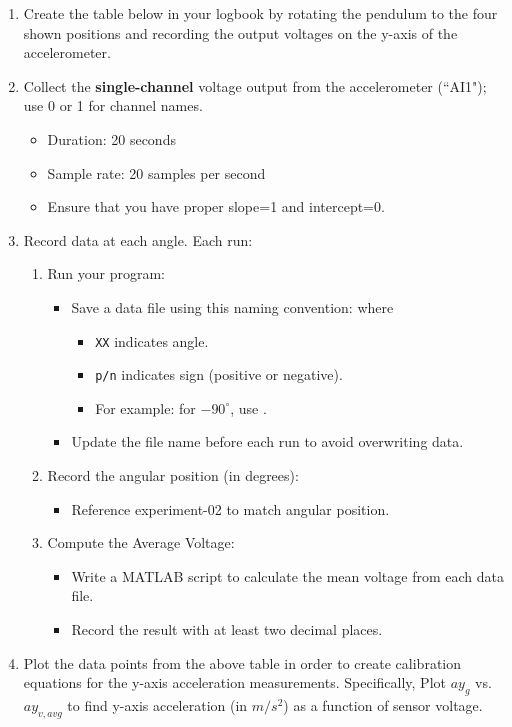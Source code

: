 \documentclass{article} %
\begin{document}
\begin{enumerate}
    \item Create the table below in your logbook by rotating the pendulum to the four shown positions and recording the output voltages on the y-axis of the accelerometer. 
    \item Collect the \textbf{single-channel} voltage output from the accelerometer (``AI1"); use 0 or 1 for channel names.
    \begin{itemize}
        \item Duration: 20 seconds
        \item Sample rate: 20 samples per second
        \item Ensure that you have proper slope=1 and intercept=0.
    \end{itemize}
    
    \item Record data at each angle. Each run:
    \begin{enumerate}[label=\alph*.]
        \item Run your program:
        \begin{itemize}
            \item Save a data file using this naming convention:  where
            \begin{itemize}
                \item \texttt{XX} indicates angle.
                \item \texttt{p/n} indicates sign (positive or negative).
                \item For example: for $-90^\circ$, use .
            \end{itemize}
            \item Update the file name before each run to avoid overwriting data.
        \end{itemize}
        
        \item Record the angular position (in degrees):
        \begin{itemize}
            \item Reference experiment-02 to match angular position.
        \end{itemize}

        \item Compute the Average Voltage:
        \begin{itemize}
            \item Write a MATLAB script to calculate the mean voltage from each data file.
            \item Record the result with at least two decimal places.
        \end{itemize}
    \end{enumerate}
    
    \item Plot the data points from the above table in order to create calibration equations for the y-axis acceleration measurements. Specifically, Plot $ay_g$ vs. $ay_{v,avg}$ to find y-axis acceleration (in $m/s^2$) as a function of sensor voltage.
\end{enumerate}
\end{document}
